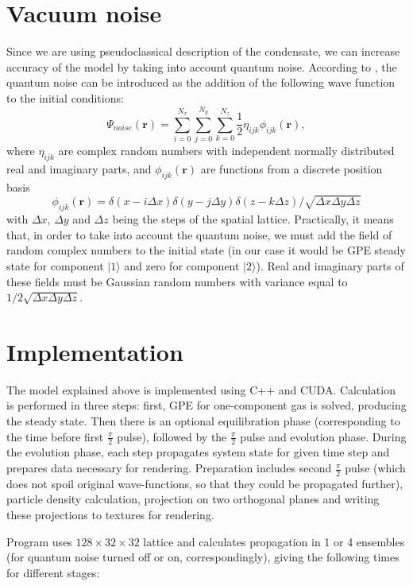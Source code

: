 \documentclass[12pt,notitlepage]{report}
\begin{document}
\section*{Vacuum noise}

Since we are using pseudoclassical description of the condensate, we can increase accuracy of the model by taking into account quantum noise. According to \cite{PhysRevA.58.4824}, the quantum noise can be introduced as the addition of the following wave function to the initial conditions:
\[ \Psi_{noise}(\mathbf{r}) = \sum_{i=0}^{N_x} \sum_{j=0}^{N_y} \sum_{k=0}^{N_z} \frac{1}{2} \eta_{ijk} \phi_{ijk}(\mathbf{r}), \]
where $\eta_{ijk}$ are complex random numbers with independent normally distributed real and imaginary parts, and $\phi_{ijk}(\mathbf{r})$ are functions from a discrete position basis
\[ \phi_{ijk}(\mathbf{r}) = \delta(x - i\Delta x) \delta(y - j\Delta y) \delta(z - k\Delta z) / \sqrt{\Delta x \Delta y \Delta z} \]
with $\Delta x$, $\Delta y$ and $\Delta z$ being the steps of the spatial lattice. Practically, it means that, in order to take into account the quantum noise, we must add the field of random complex numbers to the initial state (in our case it would be GPE steady state for component $\vert1\rangle$ and zero for component $\vert2\rangle$). Real and imaginary parts of these fields must be Gaussian random numbers with variance equal to $1 / 2 \sqrt{\Delta x \Delta y \Delta z}$.

\section*{Implementation}

The model explained above is implemented using C++ and CUDA. Calculation is performed in three steps: first, GPE for one-component gas is solved, producing the steady state. Then there is an optional equilibration phase (corresponding to the time before first $\frac{\pi}{2}$ pulse), followed by the $\frac{\pi}{2}$ pulse and evolution phase. During the evolution phase, each step propagates system state for given time step and prepares data necessary for rendering. Preparation includes second $\frac{\pi}{2}$ pulse (which does not spoil original wave-functions, so that they could be propagated further), particle density calculation, projection on two orthogonal planes and writing these projections to textures for rendering.

Program uses $128\times32\times32$ lattice and calculates propagation in 1 or 4 ensembles (for quantum noise turned off or on, correspondingly), giving the following times for different stages:
\end{document}
